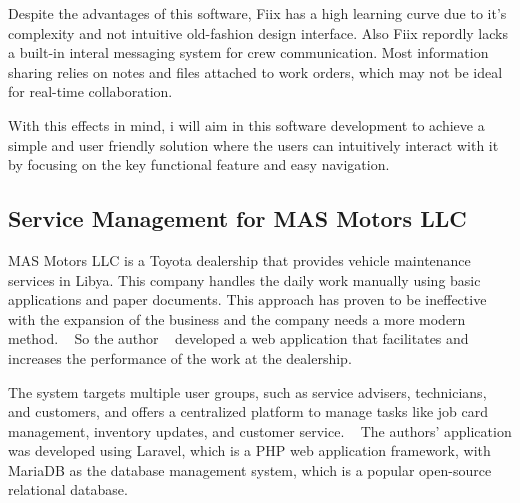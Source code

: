 Despite the advantages of this software, Fiix has a high learning curve due to it's complexity and not intuitive old-fashion design interface. 
Also Fiix repordly lacks a built-in interal messaging system for crew communication. Most information sharing relies on notes and files attached to work orders, which may not be ideal for real-time collaboration.

With this effects in mind, i will aim in this software development to achieve a simple and user friendly solution where the users can intuitively interact with it by focusing on the key functional feature and easy navigation.

\subsection{Service Management for MAS Motors LLC}
MAS Motors LLC is a Toyota dealership that provides vehicle maintenance services in Libya.
This company handles the daily work manually using basic applications and paper documents.
This approach has proven to be ineffective with the expansion of the business and the company needs a more modern method. ~\cite{MAS_MOTORS}
So the author ~\citet{MAS_MOTORS} developed a web application that facilitates and increases the performance of the work at the dealership.

The system targets multiple user groups, such as service advisers, technicians, and customers, and offers a centralized platform to manage tasks like job card management, inventory updates, and customer service. ~\cite{MAS_MOTORS}
The authors' application was developed using Laravel, which is a PHP web application framework, with MariaDB as the database management system, which is a popular open-source relational database.



